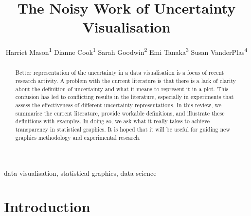 \documentclass[]{ar-1col-S2O}
\begin{document}

\title{The Noisy Work of Uncertainty Visualisation}

\author{
Harriet Mason\textsuperscript{1}
Dianne Cook\textsuperscript{1}
Sarah Goodwin\textsuperscript{2}
Emi Tanaka\textsuperscript{3}
Susan VanderPlas\textsuperscript{4}
}


\begin{abstract}
Better representation of the uncertainty in a data visualisation is a
focus of recent research activity. A problem with the current literature
is that there is a lack of clarity about the definition of uncertainty
and what it means to represent it in a plot. This confusion has led to
conflicting results in the literature, especially in experiments that
assess the effectiveness of different uncertainty representations. In
this review, we summarise the current literature, provide workable
definitions, and illustrate these definitions with examples. In doing
so, we ask what it really takes to achieve transparency in statistical
graphics. It is hoped that it will be useful for guiding new graphics
methodology and experimental research.
\end{abstract}

\begin{keywords}
data visualisation, statistical graphics, data science
\end{keywords}

\maketitle


\section{Introduction}\label{introduction}
\end{document}
